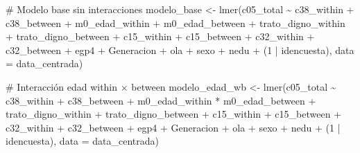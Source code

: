 \documentclass[
  spanish,
  a4paper,
  oneside]{scrbook}
\newenvironment{Shaded}{\begin{snugshade}}{\end{snugshade}}
\newcommand{\AttributeTok}[1]{\textcolor[rgb]{0.40,0.45,0.13}{#1}}
\newcommand{\CommentTok}[1]{\textcolor[rgb]{0.37,0.37,0.37}{#1}}
\newcommand{\DecValTok}[1]{\textcolor[rgb]{0.68,0.00,0.00}{#1}}
\newcommand{\FunctionTok}[1]{\textcolor[rgb]{0.28,0.35,0.67}{#1}}
\newcommand{\NormalTok}[1]{\textcolor[rgb]{0.00,0.23,0.31}{#1}}
\newcommand{\OtherTok}[1]{\textcolor[rgb]{0.00,0.23,0.31}{#1}}
\newcommand{\SpecialCharTok}[1]{\textcolor[rgb]{0.37,0.37,0.37}{#1}}
\begin{document}
\begin{Shaded}
\begin{Highlighting}[]
\CommentTok{\# Modelo base sin interacciones}
\NormalTok{modelo\_base }\OtherTok{\textless{}{-}} \FunctionTok{lmer}\NormalTok{(c05\_total }\SpecialCharTok{\textasciitilde{}} 
\NormalTok{                      c38\_within }\SpecialCharTok{+}\NormalTok{ c38\_between }\SpecialCharTok{+}
\NormalTok{                      m0\_edad\_within }\SpecialCharTok{+}\NormalTok{ m0\_edad\_between }\SpecialCharTok{+}
\NormalTok{                      trato\_digno\_within }\SpecialCharTok{+}\NormalTok{ trato\_digno\_between }\SpecialCharTok{+}
\NormalTok{                      c15\_within }\SpecialCharTok{+}\NormalTok{ c15\_between }\SpecialCharTok{+}
\NormalTok{                      c32\_within }\SpecialCharTok{+}\NormalTok{ c32\_between }\SpecialCharTok{+}
\NormalTok{                      egp4 }\SpecialCharTok{+}\NormalTok{ Generacion }\SpecialCharTok{+}\NormalTok{ ola }\SpecialCharTok{+}\NormalTok{ sexo }\SpecialCharTok{+}\NormalTok{ nedu }\SpecialCharTok{+}
\NormalTok{                      (}\DecValTok{1} \SpecialCharTok{|}\NormalTok{ idencuesta), }\AttributeTok{data =}\NormalTok{ data\_centrada)}

\CommentTok{\# Interacción edad within × between}
\NormalTok{modelo\_edad\_wb }\OtherTok{\textless{}{-}} \FunctionTok{lmer}\NormalTok{(c05\_total }\SpecialCharTok{\textasciitilde{}} 
\NormalTok{                         c38\_within }\SpecialCharTok{+}\NormalTok{ c38\_between }\SpecialCharTok{+}
\NormalTok{                         m0\_edad\_within }\SpecialCharTok{*}\NormalTok{ m0\_edad\_between }\SpecialCharTok{+}
\NormalTok{                         trato\_digno\_within }\SpecialCharTok{+}\NormalTok{ trato\_digno\_between }\SpecialCharTok{+}
\NormalTok{                         c15\_within }\SpecialCharTok{+}\NormalTok{ c15\_between }\SpecialCharTok{+}
\NormalTok{                         c32\_within }\SpecialCharTok{+}\NormalTok{ c32\_between }\SpecialCharTok{+}
\NormalTok{                         egp4 }\SpecialCharTok{+}\NormalTok{ Generacion }\SpecialCharTok{+}\NormalTok{ ola }\SpecialCharTok{+}\NormalTok{ sexo }\SpecialCharTok{+}\NormalTok{ nedu }\SpecialCharTok{+}
\NormalTok{                         (}\DecValTok{1} \SpecialCharTok{|}\NormalTok{ idencuesta), }\AttributeTok{data =}\NormalTok{ data\_centrada)}


\end{Highlighting}
\end{Shaded}
\end{document}

